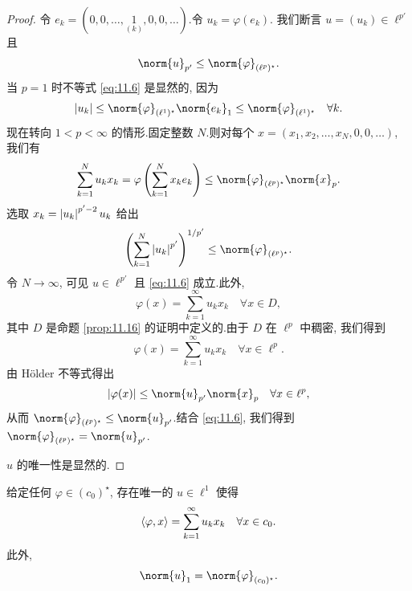 \begin{proof}
令 $e_k=(0,0,\dots,\underset{(k)}{1},0,0,\dots)$.令 $u_k=\varphi(e_k)$.
我们断言 $u=(u_k)\in\ell^{p'}$ 且
\begin{equation}
\norm{u}_{p'}\le\norm{\varphi}_{(\ell^p)^\star}.
\label{eq:11.6}
\end{equation}
当 $p=1$ 时不等式 \eqref{eq:11.6} 是显然的, 因为
\begin{equation*}
\abs{u_k}\le\norm{\varphi}_{(\ell^1)^\star}\norm{e_k}_1
\le\norm{\varphi}_{(\ell^1)^\star}\quad\forall k.
\end{equation*}
现在转向 $1<p<\infty$ 的情形.固定整数 $N$.则对每个
$x=(x_1,x_2,\dots,x_N,0,0,\dots)$, 我们有
\begin{equation}
\sum_{k=1}^N u_kx_k=\varphi\left(\sum_{k=1}^N x_ke_k\right)
\le\norm{\varphi}_{(\ell^p)^\star}\norm{x}_p.
\label{eq:11.7}
\end{equation}
选取 $x_k=\left|u_k\right|^{p'-2}u_k$ 给出
\begin{equation*}
\left(\sum_{k=1}^N\abs{u_k}^{p'}\right)^{1/p'}
\le\norm{\varphi}_{(\ell^p)^\star}.
\end{equation*}
令 $N\to\infty$, 可见 $u\in\ell^{p'}$ 且 \eqref{eq:11.6} 成立.此外,
\begin{equation*}
\varphi(x)=\sum_{k=1}^\infty u_kx_k\quad\forall x\in D,
\end{equation*}
其中 $D$ 是命题  \ref{prop:11.16} 的证明中定义的.由于 $D$ 在 $\ell^p$
中稠密, 我们得到
\begin{equation*}
\varphi(x)=\sum_{k=1}^\infty u_kx_k\quad\forall x\in\ell^p.
\end{equation*}
由 Hölder 不等式得出
\begin{equation*}
\abs{\varphi(x)}\le\norm{u}_{p'}\norm{x}_p\quad\forall x\in\ell^p,
\end{equation*}
从而 $\norm{\varphi}_{(\ell^p)^\star}\le\norm{u}_{p'}$.结合 \eqref{eq:11.6},
我们得到 $\norm{\varphi}_{(\ell^p)^\star}=\norm{u}_{p'}$.

$u$ 的唯一性是显然的.
\end{proof}

\begin{proposition}
\label{prop:11.19}
给定任何 $\varphi\in(c_0)^\star$, 存在唯一的 $u\in\ell^1$ 使得
\begin{equation*}
\left\langle \varphi,x\right\rangle=\sum_{k=1}^\infty u_kx_k\quad\forall x\in c_0.
\end{equation*}
此外,
\begin{equation*}
\norm{u}_1=\norm{\varphi}_{(c_0)^\star}.
\end{equation*}
\end{proposition}

